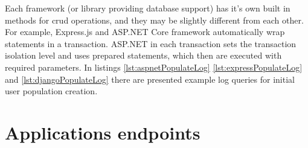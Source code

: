 Each framework (or library providing database support) has it's own built in methods for \acrshort{crud} operations, and they may be slightly different from each other. For example, Express.js and ASP.NET Core framework automatically wrap statements in a transaction. ASP.NET in each transaction sets the transaction isolation level and uses prepared statements, which then are executed with required parameters. In listings \ref{lst:aspnetPopulateLog} \ref{lst:expressPopulateLog} and \ref{lst:djangoPopulateLog} there are presented example log queries for initial user population creation.





\section{Applications endpoints}\label{sec:endpoints}

